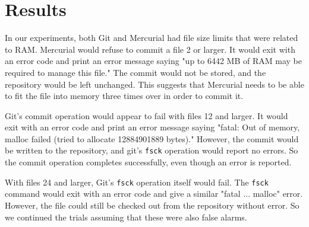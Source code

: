\section{Results}


In our experiments, both Git and Mercurial had file size limits that were related to RAM.
Mercurial would refuse to commit a file \SI{2}{\gib} or larger.
It would exit with an error code and print an error message saying "up to 6442 MB of RAM may be required to manage this file."
The commit would not be stored, and the repository would be left unchanged.
This suggests that Mercurial needs to be able to fit the file into memory three times over in order to commit it.

Git's commit operation would appear to fail with files \SI{12}{\gib} and larger.
It would exit with an error code and print an error message saying "fatal: Out of memory, malloc failed (tried to allocate 12884901889 bytes)."
However, the commit would be written to the repository, and git's \lstinline{fsck} operation would report no errors.
So the commit operation completes successfully, even though an error is reported.

With files \SI{24}{\gib} and larger, Git's \lstinline{fsck} operation itself would fail.
The \lstinline{fsck} command would exit with an error code and give a similar "fatal ... malloc" error.
However, the file could still be checked out from the repository without error.
So we continued the trials assuming that these were also false alarms.



